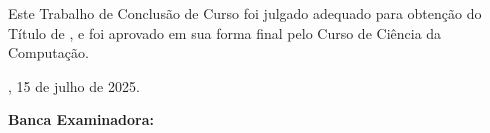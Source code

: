 \begin{folhadeaprovacao}
	\begin{center}
		{\imprimirautor}

		\begin{center}
			\ABNTEXchapterfont\bfseries\MakeUppercase{\imprimirtitulo}\ifnotempty{\imprimirsubtitulo}{: \imprimirsubtitulo}
		\end{center}

		\begin{minipage}{\textwidth}
			Este Trabalho de Conclusão de Curso foi julgado adequado para obtenção do Título de \imprimirformacao,
			e foi aprovado em sua forma final pelo Curso de Ciência da Computação.
		\end{minipage}%
	\end{center}

	\begin{center}
		\imprimirlocal, 15 de julho de 2025.
	\end{center}


	\begin{center}
		\vspace{1cm}
		\textbf{Banca Examinadora:}
	\end{center}

	\vspace{1cm}
	\assinatura{
		\textbf{\imprimirorientador} \\ \imprimirorientadorRotulo
	}


	\vspace{1cm}

	\vspace{1cm}

	\begin{center}
		\vfill
		{
			\imprimirlocal\par
			\imprimirano\par
		}
	\end{center}
\end{folhadeaprovacao}